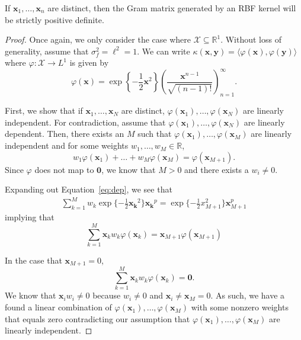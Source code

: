 \begin{lemma}
    \label{lem:rbf-pd}
    If $\mathbf{x}_1, \ldots, \mathbf{x}_n$ are distinct, then the Gram matrix generated by an RBF kernel will be strictly positive definite.
\end{lemma}
\begin{proof}
    Once again, we only consider the case where $\mathcal{X} \subseteq \mathbb{R}^{1}$.
    Without loss of generality, assume that $\sigma_f^2 = \ell^2 = 1$.
    We can write $\kappa(\mathbf{x}, \mathbf{y}) = \langle \varphi(\mathbf{x}), \varphi(\mathbf{y}) \rangle$
    where $\varphi: \mathcal{X} \to L^{1}$ is given by
    \begin{equation*}
        \varphi(\mathbf{x}) = \exp\left\{-\frac12 \mathbf{x}^2 \right\} \left(\frac{ \mathbf{x}^{n - 1} }{ \sqrt{(n - 1)!} }\right)_{n=1}^{\infty}.
    \end{equation*}

    First, we show that if $\mathbf{x}_1, \ldots, \mathbf{x}_N$ are distinct, $\varphi(\mathbf{x}_1), \ldots, \varphi(\mathbf{x}_N)$ are linearly independent.
    For contradiction, assume that $\varphi(\mathbf{x}_1), \ldots, \varphi(\mathbf{x}_N)$ are linearly dependent.
    Then, there exists an $M$ such that $\varphi(\mathbf{x}_1), \ldots, \varphi(\mathbf{x}_M)$
    are linearly independent and for some weights $w_1, \ldots, w_M \in \mathbb{R}$,
    \begin{equation}
        \label{eq:dep}
        w_1 \varphi(\mathbf{x}_1) + \ldots + w_M \varphi(\mathbf{x}_M) = \varphi(\mathbf{x}_{M + 1}).
    \end{equation}
    Since $\varphi$ does not map to $\mathbf{0}$, we know that $M > 0$ and there exists a $w_i \neq 0$.

    Expanding out Equation~\ref{eq:dep}, we see that
    \begin{align*}
        \sum\limits_{k = 1}^{M} w_k \exp \{ -\frac12 \mathbf{x_k}^2 \} \mathbf{x_k}^{p}
        = \exp \{ -\frac12 x_{M + 1}^2 \} \mathbf{x}_{M+1}^{p}
    \end{align*}
    implying that
    \begin{equation*}
        \sum\limits_{k=1}^{M} \mathbf{x}_k w_k \varphi(\mathbf{x}_k)  = \mathbf{x}_{M + 1} \varphi(\mathbf{x}_{M + 1})
    \end{equation*}

    In the case that $\mathbf{x}_{M + 1} = 0$,
    \begin{equation*}
        \sum\limits_{k=1}^{M} \mathbf{x}_k w_k \varphi(\mathbf{x}_k) = \mathbf{0}.
    \end{equation*}
    We know that $\mathbf{x}_i w_i \neq 0$ because $w_i \neq 0$ and $\mathbf{x}_i \neq \mathbf{x}_M = 0$. 
    As such, we have a found a linear combination of $\varphi(\mathbf{x}_1), \ldots, \varphi(\mathbf{x}_M)$ with some nonzero weights that equals zero contradicting our assumption that $\varphi(\mathbf{x}_1), \ldots, \varphi(\mathbf{x}_M)$ are linearly independent.


\end{proof}
